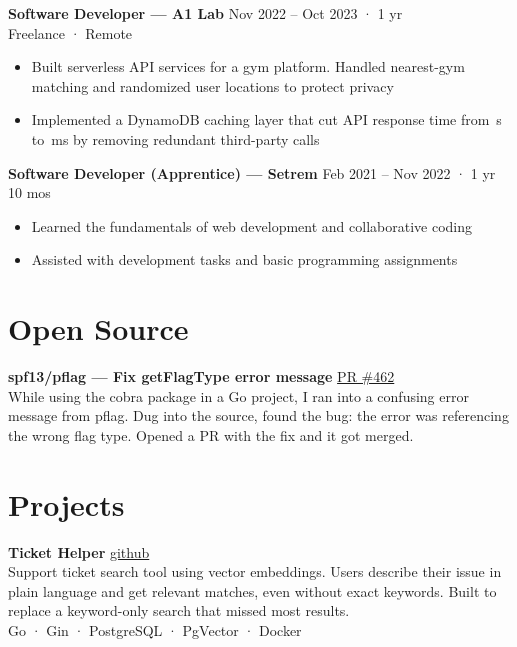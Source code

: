 \documentclass[a4paper,11pt]{article}
\begin{document}
\vspace{0.3em}
\textbf{Software Developer --- A1 Lab} \hfill {\small Nov 2022 -- Oct 2023 · 1 yr} \\
{\small\color{muted} Freelance · Remote}
\begin{itemize}
  \item Built serverless API services for a gym platform. Handled nearest-gym matching and randomized user locations to protect privacy
  \item Implemented a DynamoDB caching layer that cut API response time from \,s to \,ms by removing redundant third-party calls
\end{itemize}

\vspace{0.3em}
\textbf{Software Developer (Apprentice) --- Setrem} \hfill {\small Feb 2021 -- Nov 2022 · 1 yr 10 mos}
\begin{itemize}
  \item Learned the fundamentals of web development and collaborative coding
  \item Assisted with development tasks and basic programming assignments
\end{itemize}

\section{Open Source}

\textbf{spf13/pflag --- Fix getFlagType error message}
\hfill \href{https://github.com/spf13/pflag/pull/462}{\small PR \#462} \\
While using the cobra package in a Go project, I ran into a confusing error message from pflag.
Dug into the source, found the bug: the error was referencing the wrong flag type. Opened a PR
with the fix and it got merged.

\section{Projects}

\textbf{Ticket Helper}
\hfill \href{https://github.com/wellitonscheer/ticket-helper}{\small github} \\
Support ticket search tool using vector embeddings. Users describe their issue in plain language
and get relevant matches, even without exact keywords. Built to replace a keyword-only search
that missed most results. \\
{\small\color{muted} Go · Gin · PostgreSQL · PgVector · Docker}
\end{document}
